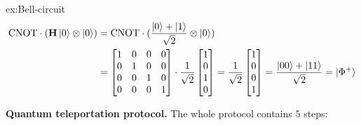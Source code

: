 \documentclass{easyclass}
\begin{document}
\begin{example}{ex:Bell-circuit}
	\begin{equation}
		\begin{aligned}
			\textrm{CNOT}\cdot(\mathbf{H}\ket{0}\otimes \ket{0})&=\textrm{CNOT}\cdot(\frac{\ket{0}+\ket{1}}{\sqrt{2}}\otimes \ket{0})\\&=
			\begin{bmatrix}
				1 & 0 & 0 & 0\\
				0 & 1 & 0 & 0\\
				0 & 0 & 1 & 0\\
				0 & 0 & 0 & 1
			\end{bmatrix}\cdot\frac{1}{\sqrt{2}}
			\begin{bmatrix}
				1\\0\\1\\0
			\end{bmatrix}=\frac{1}{\sqrt{2}}
			\begin{bmatrix}
				1\\0\\0\\1
			\end{bmatrix}=\frac{\ket{00}+\ket{11}}{\sqrt{2}}=\ket{\Phi^+}
		\end{aligned}
	\end{equation} 
\end{example}

\textbf{Quantum teleportation protocol.} The whole protocol contains $5$ steps:
\end{document}
